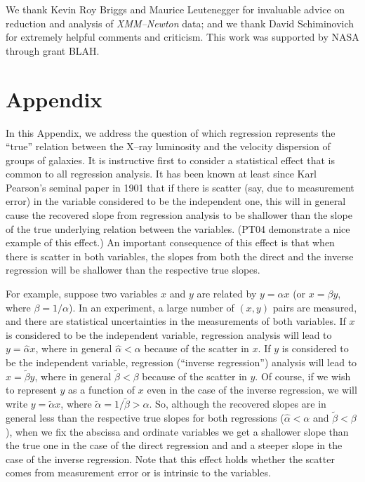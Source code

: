\documentclass[12pt,preprint]{aastex}
\begin{document}
\vspace{\baselineskip}
\vspace{\baselineskip}
We thank Kevin Roy Briggs and Maurice Leutenegger for invaluable advice on
reduction and analysis of \textsl{XMM--Newton} data;
and we thank David Schiminovich for extremely helpful comments and criticism.
This work was supported by NASA through grant BLAH.


\section*{Appendix}
\label{appendix}

In this Appendix, we address the question of which regression represents the
``true'' relation between the X--ray luminosity and the velocity dispersion of
groups of galaxies.  It is instructive first to consider a statistical
effect that is common to all regression analysis.  It has been known at
least since Karl Pearson's seminal paper in 1901 that if there is scatter (say,
due to measurement error) in the variable considered to be the independent one,
this will in general cause the recovered slope from regression analysis to
be shallower than the slope of the true underlying relation between the
variables.  (PT04 demonstrate a nice example of this effect.) An
important consequence of this effect is that when there is scatter in both
variables, the slopes from both the direct and the inverse regression will
be shallower than the respective true slopes. 

For example, suppose two variables $x$ and $y$ are related by
$y = \alpha x$ (or $x = \beta y$, where $\beta = 1/\alpha$).  In an experiment,
a large number of $(x,y)$ pairs are measured, and there are statistical
uncertainties in the measurements of both variables.  If $x$ is considered
to be the independent variable, regression analysis will lead to
$y = \hat{\alpha} x$, where in general $\hat{\alpha} < \alpha$
because of the scatter in $x$.  If $y$ is considered to be the
independent variable, regression (``inverse regression'') analysis
will lead to $x = \tilde{\beta} y$, where in general $\tilde{\beta} < \beta$
because of the scatter in $y$.  Of course, if we wish to represent $y$ as
a function of $x$ even in the case of the inverse regression, we will write
$y = \tilde{\alpha} x$, where $\tilde{\alpha} = 1/\tilde{\beta} > \alpha$.
So, although the recovered slopes are in general less than the respective true
slopes for both regressions
($\hat{\alpha} < \alpha$ and $\tilde{\beta} < \beta$),
when we fix the abscissa and ordinate variables we get a shallower slope
than the true one in the case of the direct regression and and a steeper
slope in the case of the inverse regression.  Note that this effect holds
whether the scatter comes from measurement error or is intrinsic to the
variables.
\end{document}
